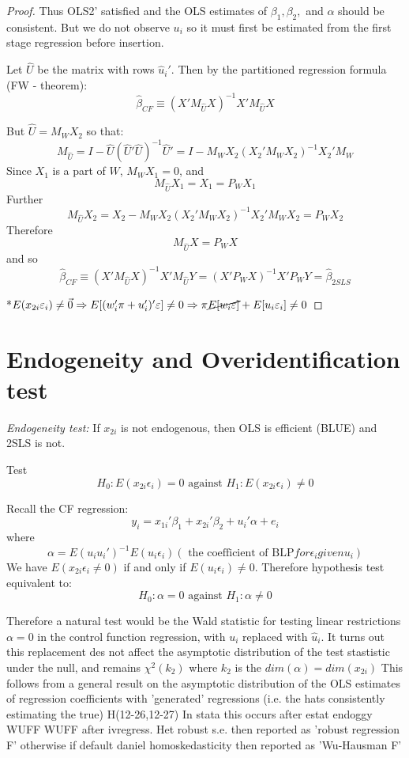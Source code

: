 \documentclass[DIV=14,titlepage=false]{scrreprt}
\begin{document}
\begin{proof}
Thus OLS2' satisfied and the OLS estimates of \(\beta_1,\beta_2,\) and \(\alpha\) should be consistent. But we do not observe \(u_i\) so it must first be estimated from the first stage regression before insertion.

Let \(\hat U\) be the matrix with rows \(\hat u_i'\). Then by the partitioned regression formula (FW - theorem):
\[\hat\beta_{CF}\equiv(X'M_{\hat U}X)^{-1}X'M_{\hat U}X\]

But \(\hat U = M_WX_2\) so that:
\[M_{\hat U}=I-\hat U(\hat U'\hat U)^{-1}\hat U'= I-M_WX_2(X_2'M_WX_2)^{-1}X_2'M_W\]
Since \(X_1\) is a part of \(W\), \(M_WX_1=0\), and
\[M_{\hat U}X_1=X_1=P_WX_1\]
Further
\[M_{\hat U}X_2=X_2-M_WX_2(X_2'M_WX_2)^{-1}X_2'M_WX_2=P_WX_2\]
Therefore
\[M_{\hat U}X=P_WX\]
and so
\[\hat\beta_{CF}\equiv(X'M_{\hat U}X)^{-1}X'M_{\hat U}Y=(X'P_WX)^{-1}X'P_WY=\hat\beta_{2SLS}\]

*\(E(x_{2i} \epsilon_i)\neq\vec0 \implies E[(w_i'\pi + u_i')'\epsilon]\neq0 \implies \pi \cancel{E[w_i\epsilon]} + E[u_i\epsilon_i]\neq0\)

\end{proof}

\section{Endogeneity and Overidentification test}

\textit{Endogeneity test:} If \(x_{2i}\) is not endogenous, then OLS is efficient (BLUE) and 2SLS is not.

Test \[H_0: E(x_{2i}\epsilon_i)=0\text{ against }H_1: E(x_{2i}\epsilon_i)\neq0\]

Recall the CF regression:
\[y_i=x_{1i}'\beta_1+x_{2i}'\beta_2+u_i'\alpha+e_i\]
where \[ \alpha = E(u_iu_i')^{-1}E(u_i\epsilon_i) (\text{ the coefficient of BLP} for \epsilon_i given u_i)\]
We have \(E(x_{2i}\epsilon_i\neq0)\) if and only if \(E(u_i\epsilon_i)\neq0\). Therefore hypothesis test equivalent to:
\[H_0: \alpha=0 \text{ against }H_1: \alpha\neq0\]

Therefore a natural test would be the Wald statistic for testing linear restrictions \(\alpha=0\) in the control function regression, with \(u_i\) replaced with \(\hat u_i\).
It turns out this replacement des not affect the asymptotic distribution of the test stastistic under the null, and remains \(\chi^2(k_2)\) where \(k_2\) is the \(dim(\alpha)=dim(x_{2i})\) 
This follows from a general result on the asymptotic distribution of the OLS estimates of regression coefficients with 'generated' regressions (i.e. the hats consistently estimating the true) H(12-26,12-27)
In stata this occurs after estat endoggy WUFF WUFF after ivregress. Het robust s.e. then reported as 'robust regression F' otherwise if default daniel homoskedasticity then reported as 'Wu-Hausman F'
\end{document}
